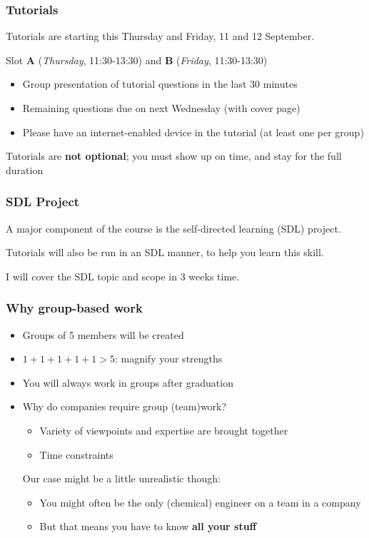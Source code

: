 \begin{frame}\frametitle{Tutorials}
	Tutorials are starting this Thursday and Friday, 11 and 12 September.
	
	\vspace{12pt}
	Slot \textbf{A} (\emph{Thursday}, 11:30-13:30) and \textbf{B} (\emph{Friday}, 11:30-13:30) 

	\begin{itemize}
		\item	Group presentation of tutorial questions in the last 30 minutes
		\item	Remaining questions due on next Wednesday {\scriptsize (with cover page)}
		\item	Please have an internet-enabled device in the tutorial (at least one per group)
	\end{itemize}
	
	\pause
	\begin{exampleblock}{}
		\centering
		{\color{red}Tutorials are \textbf{not optional};} you must show up on time, and stay for the full duration
	\end{exampleblock}
\end{frame}

\begin{frame}\frametitle{SDL Project}
	A major component of the course is the self-directed learning (SDL) project.

	\vspace{12pt}
	Tutorials will also be run in an SDL manner, to help you learn this skill.

	\vspace{12pt}
	I will cover the SDL topic and scope in 3 weeks time.
\end{frame}

\begin{frame}\frametitle{Why group-based work}
	\begin{itemize}
		\item	Groups of 5 members will be created
		\item	$1+1+1+1+1 > 5$: magnify your strengths
		\item	You will always work in groups after graduation
		\item	Why do companies require group (team)work? 
		\begin{itemize}
			\item	Variety of viewpoints and expertise are brought together
			\item	Time constraints
		\end{itemize}
		\vspace{12pt}
		\pause
		Our case might be a little unrealistic though:
		\begin{itemize}
			\item	You might often be the only (chemical) engineer on a team in a company
			\item	But that means you have to know \textbf{all your stuff}
		\end{itemize}
	\end{itemize}
\end{frame}

